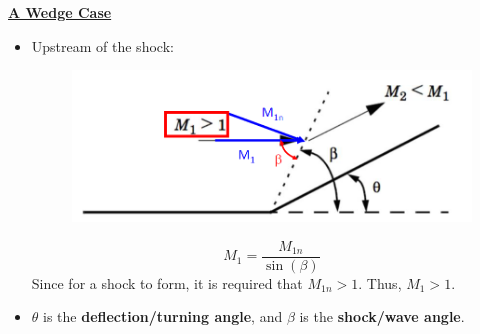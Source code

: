 \textbf{{\color{blue}\underline{A Wedge Case}}}
\begin{itemize}
    \item {\color{red}Upstream of the shock:}
    \begin{figure}[H]
        \centering
        \includegraphics[width=1.0\linewidth]{images/oblique_shocks_upstream.png}
    \end{figure}
    \begin{equation*}
        M_1 = \frac{M_{1n}}{\sin(\beta)}
    \end{equation*}
    Since for a shock to form, it is required that $M_{1n}>1$. Thus, {\color{blue}$M_1 > 1$}. 
    \item $\theta$ is the \textbf{deflection/turning angle}, and $\beta$ is the \textbf{shock/wave angle}.
    

\end{itemize}
